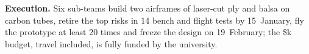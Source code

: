 \textbf{Execution.} Six sub-teams build two airframes of laser-cut ply and balsa on carbon tubes, retire the top risks in 14 bench and flight tests by 15~January, fly the prototype at least 20 times and freeze the design on 19~February; the \$\bTotalK{}k budget, travel included, is fully funded by the university.

\vspace{6pt}\noindent\begin{dbfinkpanel}
\hfill{}\hfill{}\hfill{}\hfill{}\hfill{}
\end{dbfinkpanel}
